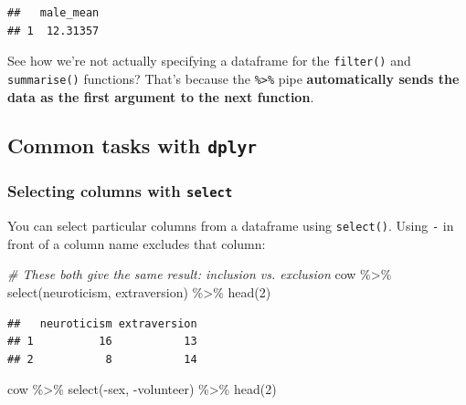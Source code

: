 \documentclass[
]{book}
\newenvironment{Shaded}{\begin{snugshade}}{\end{snugshade}}
\newcommand{\CommentTok}[1]{\textcolor[rgb]{0.56,0.35,0.01}{\textit{#1}}}
\newcommand{\DecValTok}[1]{\textcolor[rgb]{0.00,0.00,0.81}{#1}}
\newcommand{\FunctionTok}[1]{\textcolor[rgb]{0.00,0.00,0.00}{#1}}
\newcommand{\NormalTok}[1]{#1}
\newcommand{\SpecialCharTok}[1]{\textcolor[rgb]{0.00,0.00,0.00}{#1}}
\begin{document}
\begin{verbatim}
##   male_mean
## 1  12.31357
\end{verbatim}

See how we're not actually specifying a dataframe for the
\texttt{filter()} and \texttt{summarise()} functions? That's because
the \texttt{\%\textgreater{}\%} pipe \textbf{automatically sends the data as
the first argument to the next function}.

\hypertarget{common-tasks-with-dplyr}{%
\subsection{\texorpdfstring{Common tasks with \texttt{dplyr}}{Common tasks with dplyr}}\label{common-tasks-with-dplyr}}

\hypertarget{selecting-columns-with-select}{%
\subsubsection*{\texorpdfstring{Selecting columns with \texttt{select}}{Selecting columns with select}}\label{selecting-columns-with-select}}

You can select particular columns from a dataframe using \texttt{select()}. Using
\texttt{-} in front of a column name excludes that column:

\begin{Shaded}
\begin{Highlighting}[]
\CommentTok{\# These both give the same result: inclusion vs. exclusion}
\NormalTok{cow }\SpecialCharTok{\%\textgreater{}\%}
    \FunctionTok{select}\NormalTok{(neuroticism, extraversion) }\SpecialCharTok{\%\textgreater{}\%}
    \FunctionTok{head}\NormalTok{(}\DecValTok{2}\NormalTok{)}
\end{Highlighting}
\end{Shaded}

\begin{verbatim}
##   neuroticism extraversion
## 1          16           13
## 2           8           14
\end{verbatim}

\begin{Shaded}
\begin{Highlighting}[]
\NormalTok{cow }\SpecialCharTok{\%\textgreater{}\%}
    \FunctionTok{select}\NormalTok{(}\SpecialCharTok{{-}}\NormalTok{sex, }\SpecialCharTok{{-}}\NormalTok{volunteer) }\SpecialCharTok{\%\textgreater{}\%} 
    \FunctionTok{head}\NormalTok{(}\DecValTok{2}\NormalTok{)}
\end{Highlighting}
\end{Shaded}
\end{document}
